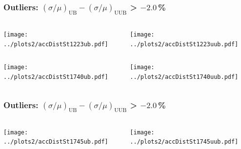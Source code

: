 \documentclass[aspectratio=169]{beamer}
\begin{document}
\begin{frame}
  \frametitle{Outliers: $(\sigma/\mu)_{\mathrm{UB}} -
  (\sigma/\mu)_{\mathrm{UUB}}$ > $-2.0$\,\% }
  \vspace{0.5cm}
  \begin{columns}
    \begin{column}{0.5\textwidth}
      \texttt{[image: ../plots2/accDistSt1223ub.pdf]}
    \end{column}
    \begin{column}{0.5\textwidth}
      \texttt{[image: ../plots2/accDistSt1223uub.pdf]}
    \end{column}
  \end{columns}
  \begin{columns}
    \begin{column}{0.5\textwidth}
      \texttt{[image: ../plots2/accDistSt1740ub.pdf]}
    \end{column}
    \begin{column}{0.5\textwidth}
      \texttt{[image: ../plots2/accDistSt1740uub.pdf]}
    \end{column}
  \end{columns}
\end{frame}

\begin{frame}
  \frametitle{Outliers: $(\sigma/\mu)_{\mathrm{UB}} -
  (\sigma/\mu)_{\mathrm{UUB}}$ > $-2.0$\,\% }
  \vspace{0.5cm}
  \begin{columns}
    \begin{column}{0.5\textwidth}
      \texttt{[image: ../plots2/accDistSt1745ub.pdf]}
    \end{column}
    \begin{column}{0.5\textwidth}
      \texttt{[image: ../plots2/accDistSt1745uub.pdf]}
    \end{column}
  \end{columns}
\end{frame}
\end{document}

